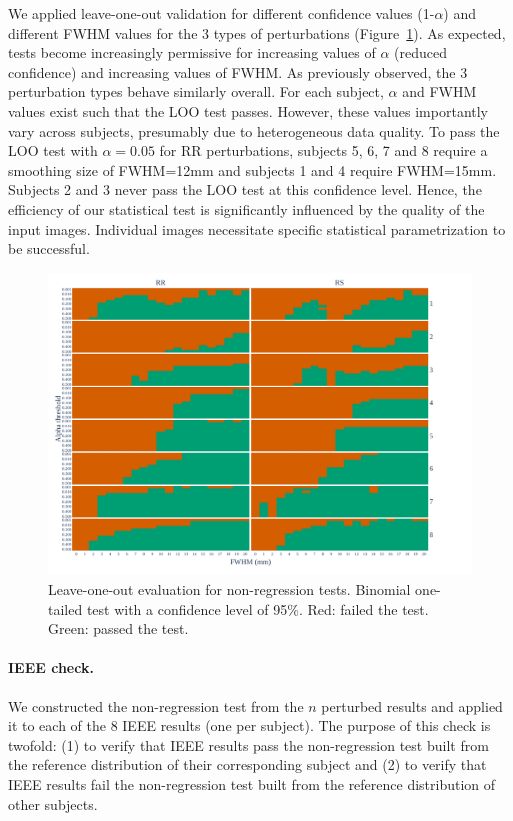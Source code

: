 \documentclass{article}
\begin{document}
We applied leave-one-out validation for different confidence values (1-$\alpha$) and different FWHM  values for the 3 types of perturbations (Figure~\ref{fig:loo_bonferroni}). As expected, tests become increasingly permissive for increasing values of $\alpha$ (reduced confidence) and increasing values of FWHM.
As previously observed, the 3 perturbation types behave similarly overall. For each subject, $\alpha$ and FWHM values exist such that the LOO test passes. However, these values importantly vary across subjects, presumably due to heterogeneous data quality. To pass the LOO test with $\alpha=0.05$ for RR perturbations, subjects 5, 6, 7 and 8 require a smoothing size of FWHM=12mm and subjects 1 and 4 require FWHM=15mm. Subjects 2 and 3 never pass the LOO test at this confidence level. Hence, the efficiency of our statistical test is significantly influenced by the quality of the input images. Individual images necessitate specific statistical parametrization to be successful.

\begin{figure}
    \centering
    \includegraphics[width=\linewidth]{figures/exclude_mct_fwe_bonferroni.pdf}
    \caption{Leave-one-out evaluation for non-regression tests.
        Binomial one-tailed test with a confidence level of 95\%.
        Red: failed the test. Green: passed the test.}
    \label{fig:loo_bonferroni}
\end{figure}


\paragraph{IEEE check.} We constructed the non-regression test from the $n$ perturbed results and applied it to each of the 8 IEEE results (one per subject). The purpose of this check is twofold: (1) to verify that IEEE results pass the non-regression test built from the reference distribution of their corresponding subject and (2) to verify that IEEE results fail the non-regression test built from the reference distribution of other subjects.
\end{document}
